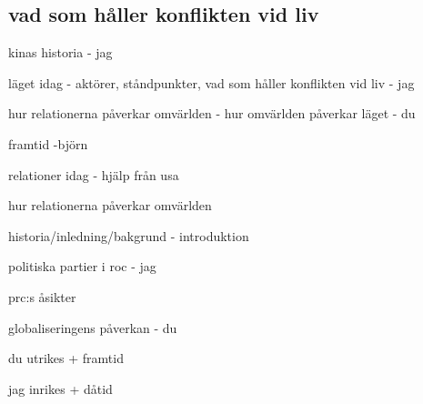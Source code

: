 \documentclass[a4paper,10pt]{article}
\begin{document}
\subsection{vad som håller konflikten vid liv}




kinas historia - jag

läget idag - aktörer, ståndpunkter, vad som håller konflikten vid liv - jag

hur relationerna påverkar omvärlden - hur omvärlden påverkar läget - du

framtid -björn


relationer idag - hjälp från usa

hur relationerna påverkar omvärlden

historia/inledning/bakgrund - introduktion

politiska partier i roc - jag

prc:s åsikter

globaliseringens påverkan - du


du utrikes + framtid

jag inrikes + dåtid
\end{document}
